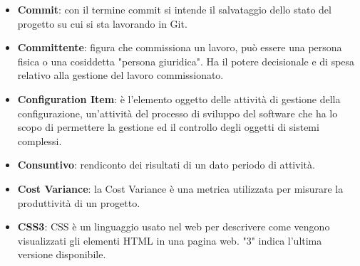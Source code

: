 \documentclass[a4paper, oneside, openany, dvipsnames, table]{article}
\begin{document}
\begin{itemize}
\item \textbf{Commit}: con il termine commit si intende il salvataggio dello stato del progetto su cui si sta lavorando in Git.
\item \textbf{Committente}: figura che commissiona un lavoro, può essere una persona fisica o una cosiddetta "persona giuridica". Ha il potere decisionale e di spesa relativo alla gestione del lavoro commissionato.
\item \textbf{Configuration Item}: è l'elemento oggetto delle attività di gestione della configurazione, un'attività del processo di sviluppo del software che ha lo scopo di permettere la gestione ed il controllo degli oggetti di sistemi complessi.
\item \textbf{Consuntivo}: rendiconto dei risultati di un dato periodo di attività.
\item \textbf{Cost Variance}: la Cost Variance è una metrica utilizzata per misurare la produttività di un progetto.
\item \textbf{CSS3}: CSS è un linguaggio usato nel web per descrivere come vengono visualizzati gli elementi HTML in una pagina web. "3" indica l'ultima versione disponibile.
\end{itemize}
\end{document}
